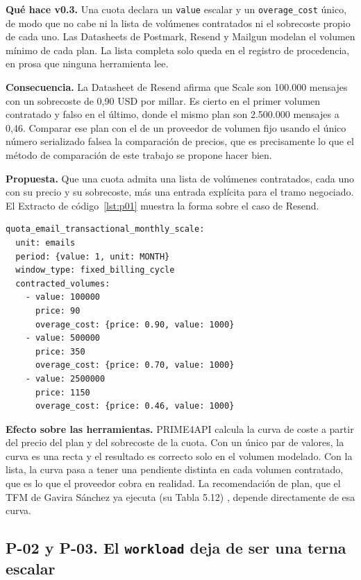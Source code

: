 \textbf{Qué hace v0.3.} Una cuota declara un \texttt{value} escalar y un \texttt{overage\_cost} único, de modo que no cabe ni la lista de volúmenes contratados ni el sobrecoste propio de cada uno.
Las Datasheets de Postmark, Resend y Mailgun modelan el volumen mínimo de cada plan.
La lista completa solo queda en el registro de procedencia, en prosa que ninguna herramienta lee.

\textbf{Consecuencia.} La Datasheet de Resend afirma que Scale son 100.000
mensajes con un sobrecoste de 0,90 USD por millar. Es cierto en el primer
volumen contratado y falso en el último, donde el mismo plan son 2.500.000
mensajes a 0,46. Comparar ese plan con el de un proveedor de volumen fijo usando
el único número serializado falsea la comparación de precios, que es precisamente
lo que el método de comparación de este trabajo se propone hacer bien.

\textbf{Propuesta.} Que una cuota admita una lista de volúmenes contratados, cada
uno con su precio y su sobrecoste, más una entrada explícita para el tramo
negociado. El Extracto de código~\ref{lst:p01} muestra la forma sobre el caso de
Resend.

\begin{lstlisting}[style=datasheetyaml,caption={P-01: volúmenes contratados dentro de un plan, con precio y sobrecoste propios (caso Resend, plan Scale; se muestran tres de los seis).},label={lst:p01}]
quota_email_transactional_monthly_scale:
  unit: emails
  period: {value: 1, unit: MONTH}
  window_type: fixed_billing_cycle
  contracted_volumes:
    - value: 100000
      price: 90
      overage_cost: {price: 0.90, value: 1000}
    - value: 500000
      price: 350
      overage_cost: {price: 0.70, value: 1000}
    - value: 2500000
      price: 1150
      overage_cost: {price: 0.46, value: 1000}
\end{lstlisting}

\textbf{Efecto sobre las herramientas.} PRIME4API calcula la curva de coste a
partir del precio del plan y del sobrecoste de la cuota. Con un único par de
valores, la curva es una recta y el resultado es correcto solo en el volumen
modelado. Con la lista, la curva pasa a tener una pendiente distinta en cada
volumen contratado, que es lo que el proveedor cobra en realidad. La recomendación
de plan, que el TFM de Gavira Sánchez ya ejecuta (su Tabla 5.12) \citep{gavira2026tfm}, depende directamente de esa curva.

\subsection{P-02 y P-03. El \texttt{workload} deja de ser una terna escalar}
\label{subsec:evolucion:p02}

